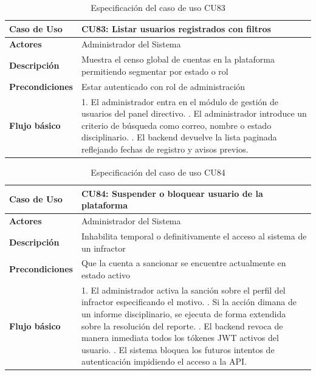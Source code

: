 \begin{table}[H]
\centering
\begin{tabular}{|p{3.2cm}|p{11.3cm}|}
\hline
\textbf{Caso de Uso} & \textbf{CU83: Listar usuarios registrados con filtros} \\ \hline
\textbf{Actores} & Administrador del Sistema \\ \hline
\textbf{Descripción} & Muestra el censo global de cuentas en la plataforma permitiendo segmentar por estado o rol \\ \hline
\textbf{Precondiciones} & Estar autenticado con rol de administración \\ \hline
\textbf{Flujo básico} & 
1. El administrador entra en el módulo de gestión de usuarios del panel directivo. \newline
2. El administrador introduce un criterio de búsqueda como correo, nombre o estado disciplinario. \newline
3. El backend devuelve la lista paginada reflejando fechas de registro y avisos previos. \\ \hline
\end{tabular}
\caption{Especificación del caso de uso CU83}
\label{tab:cu83}
\end{table}

\begin{table}[H]
\centering
\begin{tabular}{|p{3.2cm}|p{11.3cm}|}
\hline
\textbf{Caso de Uso} & \textbf{CU84: Suspender o bloquear usuario de la plataforma} \\ \hline
\textbf{Actores} & Administrador del Sistema \\ \hline
\textbf{Descripción} & Inhabilita temporal o definitivamente el acceso al sistema de un infractor \\ \hline
\textbf{Precondiciones} & Que la cuenta a sancionar se encuentre actualmente en estado activo \\ \hline
\textbf{Flujo básico} & 
1. El administrador activa la sanción sobre el perfil del infractor especificando el motivo. \newline
2. Si la acción dimana de un informe disciplinario, se ejecuta de forma extendida sobre la resolución del reporte. \newline
3. El backend revoca de manera inmediata todos los tókenes JWT activos del usuario. \newline
4. El sistema bloquea los futuros intentos de autenticación impidiendo el acceso a la API. \\ \hline
\end{tabular}
\caption{Especificación del caso de uso CU84}
\label{tab:cu84}
\end{table}

